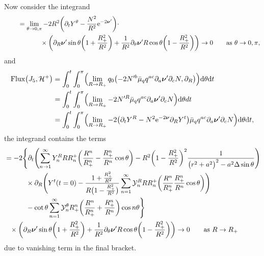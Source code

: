 \documentclass[11pt]{article}
\numberwithin{equation}{section}
\def\ptl{\partial}%
\def\mbo#1{\boldsymbol{#1}}%
\numberwithin{equation}{section}
\begin{document}
Now consider the integrand
\begin{align*}
\qquad&{}= \lim_{\theta \to 0, \pi}-2 R^2 \biggl(\ptl_ t Y^\theta - \frac{N^2}{R^2} {\rm e}^{-2 \mbo{\nu}'} \biggr) \cdot \notag\\
&\hphantom{= \lim_{\theta \to 0, \pi}}{} \times \biggl( \ptl_R \mbo{\nu}' \sin \theta \biggl(1 + \frac{R^2_+}{R^2}\biggr) + \frac{1}{R^2} \ptl_ \theta \mbo{\nu}' R \cos \theta \biggl(1- \frac{R^2_+}{R^2}\biggr) \biggr)
 \to 0 \qquad \text{as} \ \theta \to 0, \pi,
\end{align*}
and
\begin{align*}
{\rm Flux} \bigl(J_5, \mathcal{H}^+\bigr) &{}= \int^t_0 \int^\pi _0 \Bigl(\lim_{R \to R_+} q_0 \bigl(-2N'^b \bar{\mu}_q q^{ac} \ptl_a \mbo{\nu}' \ptl_c N, \ptl_R\bigr) \Bigr) {\rm d}\theta {\rm d}t \notag \\
&{}= \int^t_0 \int^\pi _0 \Bigl(\lim_{R \to R_+} - 2 N'^R \bar{\mu}_q q^{ac} \ptl_a \mbo{\nu}' \ptl_c N \Bigr) {\rm d}\theta d t \notag \\
&{}= \int^t_0 \int^\pi_0 \Bigl( \lim_{R \to R_+} -2\bigl(\ptl_t Y^R - N^2 {\rm e}^{-2 \mbo{\nu}} \ptl_R Y^t\bigr) \bar{\mu}_q q^{ac} \ptl_a \mbo{\nu}' \ptl_c N \Bigr) {\rm d}\theta {\rm d}t,
\end{align*}
the integrand contains the terms
\begin{align*}
&
=- 2 \Biggl\{ \ptl_t \Biggl(\sum^\infty_{n \to 1} Y^R_n R R^+_n \biggl(\frac{R^n}{R^n_+}- \frac{R_+^n}{R^n} \cos \theta\biggr) - R^2 \biggl(1- \frac{R^2_+}{R^2}\biggr)^2 \frac{1}{ \bigl(r^2 +a^2\bigr)^2 - a^2 \Delta \sin \theta} \Biggr) \notag\\
&\hphantom{=- 2 \Biggl\{}{}
\times\ptl_R \Biggl(Y^t(t=0)- \frac{1+ \frac{R^2_+}{R^2}}{R \bigl(1- \frac{R_+^2}{R^2}\bigr)} \sum^\infty_{n = 1} \mathcal{Y}^R_n R R^+_n \biggl(\frac{R^n}{R^n_+} \frac{R_+^n}{R^n} \cos \theta \biggr) \Biggr) \notag \\
&\hphantom{=- 2 \Biggl\{}{}
- \cot \theta \sum^\infty_{n=1} \mathcal{Y}_n^\theta R^n_+\biggl(\frac{R^n}{R^n_+} + \frac{R^n_+}{R^n} \biggr) \cos n\theta \Biggr\} \notag\\
&\hphantom{=}{}
 \times \biggl(\ptl_R \mbo{\nu}' \sin \theta \biggl(1 + \frac{R^2_+}{R^2}\biggr) + \frac{1}{R^2} \ptl_\theta \mbo{\nu}' R \cos \theta \biggl(1- \frac{R^2_+}{R^2}\biggr) \biggr)
 \to 0 \qquad \text{as} \ R \to R_+
\end{align*}
due to vanishing term in the final bracket.
\end{document}
